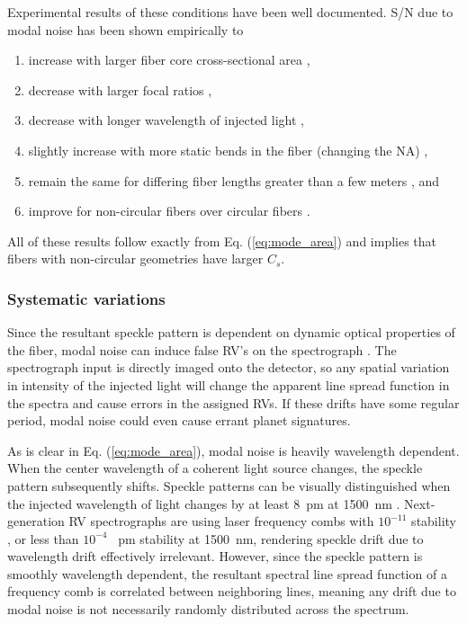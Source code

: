 \documentclass[11pt]{article}
\begin{document}
Experimental results of these conditions have been well documented. S/N due to modal noise has been shown empirically to
\begin{enumerate}
\item increase with larger fiber core cross-sectional area \citep{Lemke2010, Sablowski2016},
\item decrease with larger focal ratios \citep{Baudrand2001, Sablowski2016},
\item decrease with longer wavelength of injected light \citep{Baudrand2001},
\item slightly increase with more static bends in the fiber (changing the NA) \citep{Imai1979},
\item remain the same for differing fiber lengths greater than a few meters \citep{Baudrand2001}, and
\item improve for non-circular fibers over circular fibers \citep{Sablowski2016, Sturmer2016}.
\end{enumerate}
All of these results follow exactly from Eq. (\ref{eq:mode_area}) and implies that fibers with non-circular geometries have larger $C_{s}$.

\subsubsection{Systematic variations}
\label{subsec:sys_var}

Since the resultant speckle pattern is dependent on dynamic optical properties of the fiber, modal noise can induce false RV's on the spectrograph \citep{Mahadevan2014}. The spectrograph input is directly imaged onto the detector, so any spatial variation in intensity of the injected light will change the apparent line spread function in the spectra and cause errors in the assigned RVs. If these drifts have some regular period, modal noise could even cause errant planet signatures.

As is clear in Eq. (\ref{eq:mode_area}), modal noise is heavily wavelength dependent. When the center wavelength of a coherent light source changes, the speckle pattern subsequently shifts.  Speckle patterns can be visually distinguished when the injected wavelength of light changes by at least \SI{8}{\pico\meter} at \SI{1500}{\nano\meter} \citep{Redding2013}. Next-generation RV spectrographs are using laser frequency combs with $10^{-11}$ stability \citep{Probst2014}, or less than $10^{-4}$ \SI{}{\pico\meter} stability at \SI{1500}{\nano\meter}, rendering speckle drift due to wavelength drift effectively irrelevant. However, since the speckle pattern is smoothly wavelength dependent, the resultant spectral line spread function of a frequency comb is correlated between neighboring lines, meaning any drift due to modal noise is not necessarily randomly distributed across the spectrum.
\end{document}
